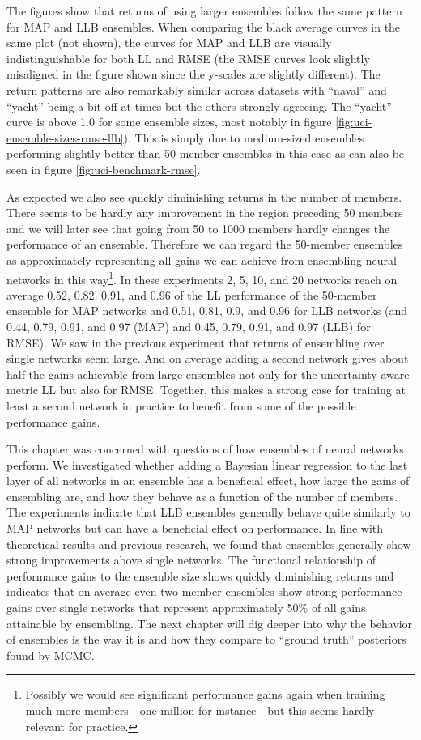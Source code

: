 \documentclass[../thesis.tex]{subfiles}
\begin{document}
The figures show that returns of using larger ensembles follow the same pattern for MAP and LLB ensembles. When comparing the black average curves in the same plot (not shown), the curves for MAP and LLB are visually indistinguishable for both LL and RMSE (the RMSE curves look slightly misaligned in the figure shown since the y-scales are slightly different). The return patterns are also remarkably similar across datasets with ``naval'' and ``yacht'' being a bit off at times but the others strongly agreeing. The ``yacht'' curve is above 1.0 for some ensemble sizes, most notably in figure \ref{fig:uci-ensemble-sizes-rmse-llb}). This is simply due to medium-sized ensembles performing slightly better than 50-member ensembles in this case as can also be seen in figure \ref{fig:uci-benchmark-rmse}.

As expected we also see quickly diminishing returns in the number of members. There seems to be hardly any improvement in the region preceding 50 members and we will later see that going from 50 to 1000 members hardly changes the performance of an ensemble. Therefore we can regard the 50-member ensembles as approximately representing all gains we can achieve from ensembling neural networks in this way\footnote{Possibly we would see significant performance gains again when training much more members---one million for instance---but this seems hardly relevant for practice.}. In these experiments 2, 5, 10, and 20 networks reach on average 0.52, 0.82, 0.91, and 0.96 of the LL performance of the 50-member ensemble for MAP networks and 0.51, 0.81, 0.9, and 0.96 for LLB networks (and 0.44, 0.79, 0.91, and 0.97 (MAP) and 0.45, 0.79, 0.91, and 0.97 (LLB) for RMSE). We saw in the previous experiment that returns of ensembling over single networks seem large. And on average adding a second network gives about half the gains achievable from large ensembles not only for the uncertainty-aware metric LL but also for RMSE. Together, this makes a strong case for training at least a second network in practice to benefit from some of the possible performance gains.

This chapter was concerned with questions of how ensembles of neural networks perform. We investigated whether adding a Bayesian linear regression to the last layer of all networks in an ensemble has a beneficial effect, how large the gains of ensembling are, and how they behave as a function of the number of members. The experiments indicate that LLB ensembles generally behave quite similarly to MAP networks but can have a beneficial effect on performance. In line with theoretical results and previous research, we found that ensembles generally show strong improvements above single networks. The functional relationship of performance gains to the ensemble size shows quickly diminishing returns and indicates that on average even two-member ensembles show strong performance gains over single networks that represent approximately 50\% of all gains attainable by ensembling. The next chapter will dig deeper into why the behavior of ensembles is the way it is and how they compare to ``ground truth'' posteriors found by MCMC.
\end{document}
